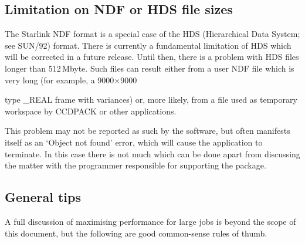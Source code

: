 \documentclass[twoside,11pt]{article}
\newcommand{\html}[1]{}
\newcommand{\latex}[1]{#1}
\newcommand{\xref}[3]{#1}
\newcommand{\xlabel}[1]{}
\begin{document}
\subsection{\xlabel{HDS-LIMIT}Limitation on NDF or HDS file sizes}

The Starlink NDF format is a special case of the HDS (Hierarchical Data
System; see \xref{SUN/92}{sun92}{}\cite{SUN92}) format.
There is currently a fundamental limitation of HDS which will be corrected
in a future release.
Until then, there is a problem with HDS files longer than 512\,Mbyte.
Such files can result either from a user NDF file which is very long
(for example, a \latex{9000$\times$9000}
\html{9000x9000 }
type \_REAL frame with variances) or, more likely,
from a file used as temporary workspace by CCDPACK or other applications.

This problem may not be reported as such by the software,
but often manifests itself as an `Object not found' error,
which will cause the application to terminate.
In this case there is not much which can be done apart from
discussing the matter with the programmer
responsible for supporting the package.

\subsection{\xlabel{LARGE-GENERAL}General tips}

A full discussion of maximising performance for large jobs
is beyond the scope of this document,
but the following are good common-sense rules of thumb.
\end{document}
